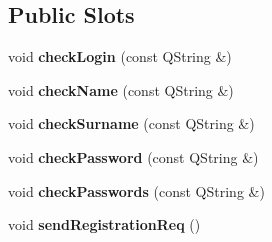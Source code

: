 \subsection*{Public Slots}
\begin{DoxyCompactItemize}
\item 
void {\bfseries check\+Login} (const Q\+String \&)\hypertarget{classRegistrationWindow_a054fcf4544f917e106aa6760f720d7b2}{}\label{classRegistrationWindow_a054fcf4544f917e106aa6760f720d7b2}

\item 
void {\bfseries check\+Name} (const Q\+String \&)\hypertarget{classRegistrationWindow_a26d58595ac8df47a0456878a80c45ffc}{}\label{classRegistrationWindow_a26d58595ac8df47a0456878a80c45ffc}

\item 
void {\bfseries check\+Surname} (const Q\+String \&)\hypertarget{classRegistrationWindow_a6fc9f673b5e1d2fd15c9e12bfc0174b2}{}\label{classRegistrationWindow_a6fc9f673b5e1d2fd15c9e12bfc0174b2}

\item 
void {\bfseries check\+Password} (const Q\+String \&)\hypertarget{classRegistrationWindow_a761ec197a38b335aaa5db06287361849}{}\label{classRegistrationWindow_a761ec197a38b335aaa5db06287361849}

\item 
void {\bfseries check\+Passwords} (const Q\+String \&)\hypertarget{classRegistrationWindow_a6c3761195b00134d3ef4decf91ea76e7}{}\label{classRegistrationWindow_a6c3761195b00134d3ef4decf91ea76e7}

\item 
void {\bfseries send\+Registration\+Req} ()\hypertarget{classRegistrationWindow_a4344e4dafa6ab47e564c243b20a0c7a4}{}\label{classRegistrationWindow_a4344e4dafa6ab47e564c243b20a0c7a4}

\end{DoxyCompactItemize}
